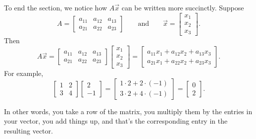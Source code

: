 \documentclass{ximera}
\begin{document}
To end the section, we notice how $A \vec{x}$ can be written more succinctly. Suppose
\begin{equation*}
    A = 
    \begin{bmatrix}
        a_{11} & a_{12} & a_{13} \\
        a_{21} & a_{22} & a_{23}
    \end{bmatrix}
    \qquad \text{and} \qquad \vec{x} = 
    \begin{bmatrix}
        x_1 \\ 
        x_2 \\ 
        x_3 
    \end{bmatrix} .
\end{equation*}
Then
\begin{equation*}
    A \vec{x} = 
    \begin{bmatrix}
        a_{11} & a_{12} & a_{13} \\
        a_{21} & a_{22} & a_{23}
    \end{bmatrix}
    \begin{bmatrix}
        x_1 \\ 
        x_2 \\ 
        x_3 
    \end{bmatrix} 
    =
    \begin{bmatrix}
        a_{11} x_1 + a_{12} x_2 + a_{13} x_3 \\
        a_{21} x_1 + a_{22} x_2 + a_{23} x_3
    \end{bmatrix}  .
\end{equation*}
For example,
\begin{equation*}
    \begin{bmatrix}
        1 & 2 \\ 
        3 & 4
    \end{bmatrix}
    \begin{bmatrix}
        2 \\ 
        -1
    \end{bmatrix} 
    =
    \begin{bmatrix}
        1 \cdot 2 + 2 \cdot (-1) \\
        3 \cdot 2 + 4 \cdot (-1)
    \end{bmatrix}
    =
    \begin{bmatrix}
        0 \\ 
        2
    \end{bmatrix}  .
\end{equation*}

In other words, you take a row of the matrix, you multiply them by the entries in your vector, you add things up, and that's the corresponding entry in the resulting vector.
\end{document}
